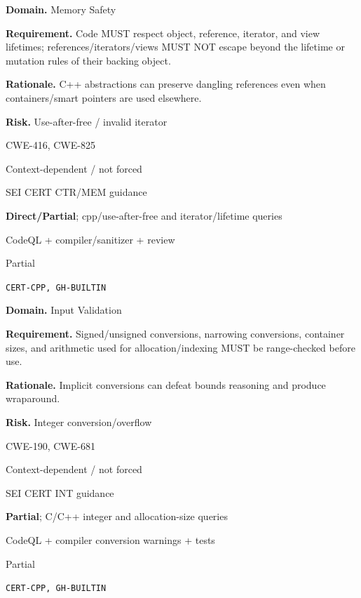 \documentclass[10pt,letterpaper]{article}
\newcommand{\prioritybadge}[2]{\tcbox[on line,boxrule=0pt,arc=1.2mm,boxsep=0.7mm,left=1mm,right=1mm,top=0.4mm,bottom=0.4mm,colback=#2!12,coltext=#2]{\scriptsize\bfseries #1}}
\begin{document}
\begin{rulebox}[title={\texttt{SCS-CPP-MEM-002} \hfill \prioritybadge{Critical Control}{Critical}}]
\textbf{Domain.} Memory Safety

\textbf{Requirement.} Code MUST respect object, reference, iterator, and view lifetimes; references/iterators/views MUST NOT escape beyond the lifetime or mutation rules of their backing object.

\textbf{Rationale.} C++ abstractions can preserve dangling references even when containers/smart pointers are used elsewhere.

\textbf{Risk.} Use-after-free / invalid iterator

\begin{description}[leftmargin=2.65cm,labelwidth=2.3cm,style=nextline,itemsep=1pt,topsep=3pt]
  \item[CWE] CWE-416, CWE-825
  \item[OWASP] Context-dependent / not forced
  \item[CERT] SEI CERT CTR/MEM guidance
  \item[CodeQL] \textbf{Direct/Partial}; cpp/use-after-free and iterator/lifetime queries
  \item[Enforcement] CodeQL + compiler/sanitizer + review
  \item[Automation] Partial
  \item[Sources] \texttt{CERT-CPP, GH-BUILTIN}
\end{description}
\end{rulebox}

\begin{rulebox}[title={\texttt{SCS-CPP-INPUT-001} \hfill \prioritybadge{High Priority}{High}}]
\textbf{Domain.} Input Validation

\textbf{Requirement.} Signed/unsigned conversions, narrowing conversions, container sizes, and arithmetic used for allocation/indexing MUST be range-checked before use.

\textbf{Rationale.} Implicit conversions can defeat bounds reasoning and produce wraparound.

\textbf{Risk.} Integer conversion/overflow

\begin{description}[leftmargin=2.65cm,labelwidth=2.3cm,style=nextline,itemsep=1pt,topsep=3pt]
  \item[CWE] CWE-190, CWE-681
  \item[OWASP] Context-dependent / not forced
  \item[CERT] SEI CERT INT guidance
  \item[CodeQL] \textbf{Partial}; C/C++ integer and allocation-size queries
  \item[Enforcement] CodeQL + compiler conversion warnings + tests
  \item[Automation] Partial
  \item[Sources] \texttt{CERT-CPP, GH-BUILTIN}
\end{description}
\end{rulebox}
\end{document}

